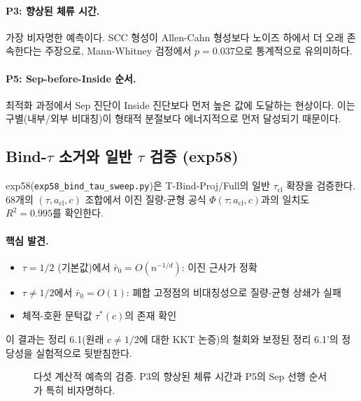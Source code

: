 \paragraph{P3: 향상된 체류 시간.} 가장 비자명한 예측이다. SCC 형성이 Allen-Cahn 형성보다 노이즈 하에서 더 오래 존속한다는 주장으로, Mann-Whitney 검정에서 $p = 0.037$으로 통계적으로 유의미하다.

\paragraph{P5: Sep-before-Inside 순서.} 최적화 과정에서 Sep 진단이 Inside 진단보다 먼저 높은 값에 도달하는 현상이다. 이는 구별(내부/외부 비대칭)이 형태적 분절보다 에너지적으로 먼저 달성되기 때문이다.

\subsection{Bind-$\tau$ 소거와 일반 $\tau$ 검증 (exp58)}

exp58(\texttt{exp58\_bind\_tau\_sweep.py})은 T-Bind-Proj/Full의 일반 $\tau_{\mathrm{cl}}$ 확장을 검증한다. 68개의 $(\tau, a_{\mathrm{cl}}, c)$ 조합에서 이진 질량-균형 공식 $\Phi(\tau; a_{\mathrm{cl}}, c)$과의 일치도 $R^2 = 0.995$를 확인한다.

\paragraph{핵심 발견.}
\begin{itemize}
    \item $\tau = 1/2$ (기본값)에서 $\bar{r}_0 = O(n^{-1/d})$: 이진 근사가 정확
    \item $\tau \neq 1/2$에서 $\bar{r}_0 = O(1)$: 폐합 고정점의 비대칭성으로 질량-균형 상쇄가 실패
    \item 체적-호환 문턱값 $\tau^*(c)$의 존재 확인
\end{itemize}

이 결과는 정리 6.1(원래 $c \neq 1/2$에 대한 KKT 논증)의 철회와 보정된 정리 6.1'의 정당성을 실험적으로 뒷받침한다.

\begin{figure}[t]
\centering
{}
\caption{다섯 계산적 예측의 검증. P3의 향상된 체류 시간과 P5의 Sep 선행 순서가 특히 비자명하다.}
\label{fig:predictions}
\end{figure}

